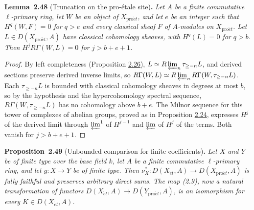 \documentclass[11pt]{article}
\newenvironment{bpstatement}[2]{\par\addvspace{0.6\baselineskip}\noindent\textbf{#1}#2\textbf{.}\enspace\ignorespaces}
  {\par\addvspace{0.4\baselineskip}}
\newenvironment{bpstatementit}[2]{\begin{bpstatement}{#1}{#2}\itshape\ignorespaces}{\end{bpstatement}}
\begin{document}
\label{bp144}%
\begin{bpstatementit}{Lemma~2.48}{ (Truncation on the pro-étale site)}
Let \(A\) be a finite commutative \(\ell\)-primary ring, let \(W\) be an object of \(X_{\mathrm{pro}\acute{e}t}\), and let \(e\) be an integer such that \(H^q(W,F)=0\) for \(q>e\) and every classical sheaf \(F\) of \(A\)-modules on \(X_{\mathrm{pro}\acute{e}t}\). Let \(L\in D(X_{\mathrm{pro}\acute{e}t},A)\) have classical cohomology sheaves, with \(H^q(L)=0\) for \(q>b\). Then \(H^jR\Gamma(W,L)=0\) for \(j>b+e+1\).
\end{bpstatementit}

\begin{proof}[{Proof}]\label{bp145}%
By left completeness (Proposition \hyperref[bp77]{2.26}), \(L\simeq R\varprojlim_n\tau_{\geq-n}L\), and derived sections preserve derived inverse limits, so \(R\Gamma(W,L)\simeq R\varprojlim_nR\Gamma(W,\tau_{\geq-n}L)\). Each \(\tau_{\geq-n}L\) is bounded with classical cohomology sheaves in degrees at most \(b\), so by the hypothesis and the hypercohomology spectral sequence, \(R\Gamma(W,\tau_{\geq-n}L)\) has no cohomology above \(b+e\). The Milnor sequence for this tower of complexes of abelian groups, proved as in Proposition \hyperref[bp71]{2.24}, expresses \(H^j\) of the derived limit through \(\varprojlim^1\) of \(H^{j-1}\) and \(\varprojlim\) of \(H^j\) of the terms. Both vanish for \(j>b+e+1\).
\end{proof}

\label{bp146}%
\begin{bpstatementit}{Proposition~2.49}{ (Unbounded comparison for finite coefficients)}
Let \(X\) and \(Y\) be of finite type over the base field \(k\), let \(A\) be a finite commutative \(\ell\)-primary ring, and let \(g:X\to Y\) be of finite type. Then \(\nu_X^*:D(X_{\acute{e}t},A)\to D(X_{\mathrm{pro}\acute{e}t},A)\) is fully faithful and preserves arbitrary direct sums. The map (2.9), now a natural transformation of functors \(D(X_{\acute{e}t},A)\to D(Y_{\mathrm{pro}\acute{e}t},A)\), is an isomorphism for every \(K\in D(X_{\acute{e}t},A)\).
\end{bpstatementit}
\end{document}
